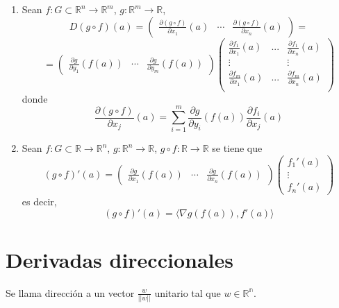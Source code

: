 \begin{ejm}
\begin{enumerate}[label=(\roman*)]
    \item Sean $f:G\subset\mathbb{R}^n \rightarrow \mathbb{R}^m$, $g:\mathbb{R}^m \rightarrow \mathbb{R}$, \[ D(g\circ f)(a) = 
    \begin{pmatrix}
        \frac{\partial(g\circ f)}{\partial x_1}(a)&\cdots&\frac{\partial(g\circ f)}{\partial x_n}(a)
    \end{pmatrix} =\]
    \[=
    \begin{pmatrix}
        \frac{\partial g}{\partial y_1}(f(a))&\cdots&\frac{\partial g}{\partial y_m}(f(a))
    \end{pmatrix} 
    \begin{pmatrix}
        \frac{\partial f_1}{\partial x_1}(a)&...&\frac{\partial f_1}{\partial x_n}(a)\\
        \vdots&&\vdots\\
        \frac{\partial f_m}{\partial x_1}(a)&...&\frac{\partial f_m}{\partial x_n}(a)\\
    \end{pmatrix}\]
    donde \[ \frac{\partial(g\circ f)}{\partial x_j}(a) = \sum_{i=1}^m \frac{\partial g}{\partial y_i}(f(a))\frac{\partial f_i}{\partial x_j}(a)\]
    
    \item Sean $f:G\subset\mathbb{R} \rightarrow \mathbb{R}^n$, $g:\mathbb{R}^n \rightarrow \mathbb{R}$, $g\circ f :\mathbb{R} \rightarrow \mathbb{R}$ se tiene que \[ (g \circ f)'(a) = 
    \begin{pmatrix}
        \frac{\partial g}{\partial x_1}(f(a))&\cdots&\frac{\partial g}{\partial x_n}(f(a))
    \end{pmatrix}
    \begin{pmatrix}
        f_1'(a) \\
        \vdots\\
        f_n'(a)
    \end{pmatrix}\]
    es decir,
    \[ (g \circ f)'(a) = \langle \nabla g(f(a)), f'(a)\rangle \]
\end{enumerate}
\end{ejm}

\section{Derivadas direccionales}

\begin{defn}
Se llama dirección a un vector $\frac{w}{||w||}$ unitario tal que $w\in\mathbb{R^n}$.
\end{defn}

